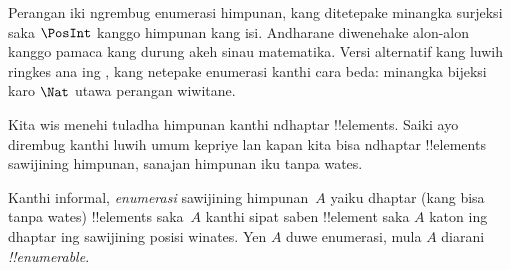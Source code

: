 \documentclass[../../../include/open-logic-section]{subfiles}
\begin{document}


\begin{editorial}
  Perangan iki ngrembug enumerasi himpunan, kang ditetepake minangka
  surjeksi saka $\PosInt$ kanggo himpunan kang isi. Andharane diwenehake alon-alon kanggo pamaca
  kang durung akeh sinau matematika. Versi alternatif kang luwih ringkes
  ana ing , kang netepake enumerasi
  kanthi cara beda: minangka bijeksi karo $\Nat$ utawa perangan wiwitane.
\end{editorial}

\begin{explain}
Kita wis menehi tuladha himpunan kanthi ndhaptar !!{element}s.
Saiki ayo dirembug kanthi luwih umum kepriye lan kapan kita bisa
ndhaptar !!{element}s sawijining himpunan, sanajan himpunan iku tanpa wates.
\end{explain}

\begin{defn}
Kanthi informal, \emph{enumerasi} sawijining himpunan~$A$ yaiku dhaptar
(kang bisa tanpa wates) !!{element}s saka~$A$ kanthi sipat saben !!{element} saka $A$
katon ing dhaptar ing sawijining posisi winates. Yen $A$ duwe
enumerasi, mula $A$ diarani \emph{!!{enumerable}}.
\end{defn}
\end{document}
